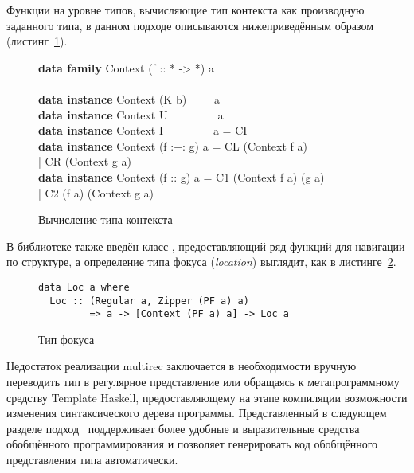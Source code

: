 Функции на уровне типов, вычисляющие тип контекста как производную заданного типа, в данном подходе описываются нижеприведённым образом (листинг~\ref{list:ctx}).
\begin{figure}[h]
\begin{framed}
\ttfamily\small
\textbf{data family} Context (f :: * -> *) a\\
\\
\textbf{data instance} Context (K b)~~~~~a\\
\textbf{data instance} Context U~~~~~~~~~a\\
\textbf{data instance} Context I~~~~~~~~~a = CI\\
\textbf{data instance} Context (f :+: g) a = CL (Context f a)\\
\indN{~~~~~~~~~~~~~~~~~~~~~~~~~~~~~~~~~~}| CR (Context g a)\\
\textbf{data instance} Context (f :\tms: g) a = C1 (Context f a) (g a)\\
\indN{~~~~~~~~~~~~~~~~~~~~~~~~~~~~~~~~~~}| C2 (f a) (Context g a)
\end{framed}
\caption{Вычисление типа контекста}
\label{list:ctx}
\end{figure}

В библиотеке также введён класс , предоставляющий ряд функций для навигации по структуре, а определение типа фокуса (\textsl{location}) выглядит, как в листинге~\ref{list:loc}.
\begin{figure}[h]
\begin{framed}
\vspace{-0.25cm}
\begin{lstlisting}
data Loc a where
  Loc :: (Regular a, Zipper (PF a) a)
         => a -> [Context (PF a) a] -> Loc a
\end{lstlisting}
\vspace{-0.25cm}
\end{framed}
\caption{Тип фокуса}
\label{list:loc}
\end{figure}

Недостаток реализации \textsf{multirec} заключается в необходимости вручную переводить тип в регулярное представление или обращаясь к метапрограммному средству \textsf{Template Haskell}, предоставляющему на этапе компиляции возможности изменения синтаксического дерева программы. Представленный в следующем разделе подход~\cite{VriLoh2014} поддерживает более удобные и выразительные средства обобщённого программирования и позволяет генерировать код обобщённого представления типа автоматически.

